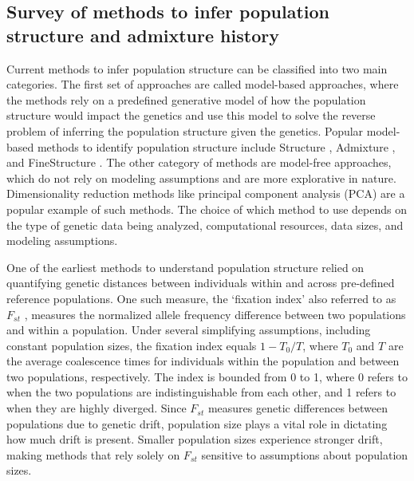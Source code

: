 \subsection{Survey of methods to infer population structure and admixture history}
\label{sec:ch1-gb-survey}
Current methods to infer population structure can be classified into two main categories. The first set of approaches are called model-based approaches, where the methods rely on a predefined generative model of how the population structure would impact the genetics and use this model to solve the reverse problem of inferring the population structure given the genetics. Popular model-based methods to identify population structure include Structure \cite{Pritchard2000}, Admixture \cite{Alexander2009}, and FineStructure \cite{Lawson2012}. The other category of methods are model-free approaches, which do not rely on modeling assumptions and are more explorative in nature. Dimensionality reduction methods like principal component analysis (PCA) are a popular example of such methods. The choice of which method to use depends on the type of genetic data being analyzed, computational resources, data sizes, and modeling assumptions.

One of the earliest methods to understand population structure relied on quantifying genetic distances between individuals within and across pre-defined reference populations. One such measure, the `fixation index' also referred to as \(F_{st}\) \cite{Wright1951, Malecot1948}, measures the normalized allele frequency difference between two populations and within a population. Under several simplifying assumptions, including constant population sizes, the fixation index equals \(1 - T_0/T\), where \(T_0\) and \(T\) are the average coalescence times for individuals within the population and between two populations, respectively. The index is bounded from 0 to 1, where 0 refers to when the two populations are indistinguishable from each other, and 1 refers to when they are highly diverged. Since \(F_{st}\) measures genetic differences between populations due to genetic drift, population size plays a vital role in dictating how much drift is present. Smaller population sizes experience stronger drift, making methods that rely solely on \(F_{st}\) sensitive to assumptions about population sizes.

